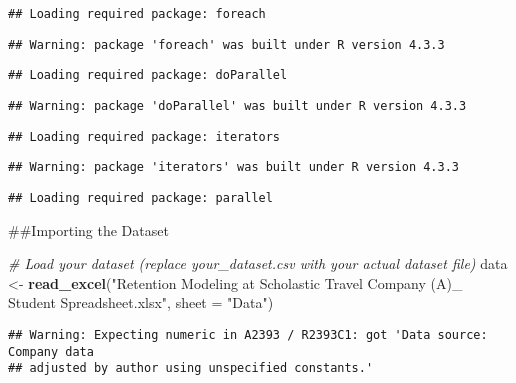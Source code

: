 \documentclass[
]{article}
\newenvironment{Shaded}{\begin{snugshade}}{\end{snugshade}}
\newcommand{\AttributeTok}[1]{\textcolor[rgb]{0.13,0.29,0.53}{#1}}
\newcommand{\CommentTok}[1]{\textcolor[rgb]{0.56,0.35,0.01}{\textit{#1}}}
\newcommand{\FloatTok}[1]{\textcolor[rgb]{0.00,0.00,0.81}{#1}}
\newcommand{\FunctionTok}[1]{\textcolor[rgb]{0.13,0.29,0.53}{\textbf{#1}}}
\newcommand{\NormalTok}[1]{#1}
\newcommand{\OtherTok}[1]{\textcolor[rgb]{0.56,0.35,0.01}{#1}}
\newcommand{\SpecialCharTok}[1]{\textcolor[rgb]{0.81,0.36,0.00}{\textbf{#1}}}
\newcommand{\StringTok}[1]{\textcolor[rgb]{0.31,0.60,0.02}{#1}}
\begin{document}
\begin{verbatim}
## Loading required package: foreach
\end{verbatim}

\begin{verbatim}
## Warning: package 'foreach' was built under R version 4.3.3
\end{verbatim}

\begin{verbatim}
## Loading required package: doParallel
\end{verbatim}

\begin{verbatim}
## Warning: package 'doParallel' was built under R version 4.3.3
\end{verbatim}

\begin{verbatim}
## Loading required package: iterators
\end{verbatim}

\begin{verbatim}
## Warning: package 'iterators' was built under R version 4.3.3
\end{verbatim}

\begin{verbatim}
## Loading required package: parallel
\end{verbatim}

\#\#Importing the Dataset

\begin{Shaded}
\begin{Highlighting}[]
\CommentTok{\# Load your dataset (replace \textquotesingle{}your\_dataset.csv\textquotesingle{} with your actual dataset file)}
\NormalTok{data }\OtherTok{\textless{}{-}} \FunctionTok{read\_excel}\NormalTok{(}\StringTok{"Retention Modeling at Scholastic Travel Company (A)\_ Student Spreadsheet.xlsx"}\NormalTok{, }\AttributeTok{sheet =} \StringTok{"Data"}\NormalTok{)}
\end{Highlighting}
\end{Shaded}

\begin{verbatim}
## Warning: Expecting numeric in A2393 / R2393C1: got 'Data source: Company data
## adjusted by author using unspecified constants.'
\end{verbatim}

\begin{Shaded}
\end{Shaded}
\end{document}
